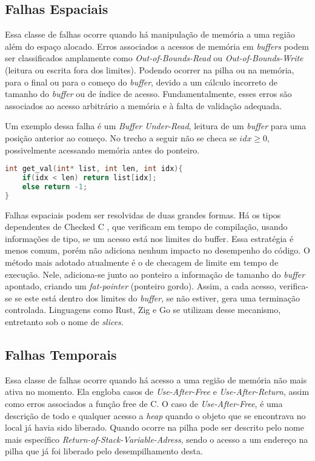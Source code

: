 \subsection{Falhas Espaciais}
\label{sec:mem-error:spacial}

Essa classe de falhas ocorre quando há manipulação de memória a uma região 
além do espaço alocado. Erros associados a acessos de memória em \emph{buffers} 
podem ser classificados amplamente como \emph{Out-of-Bounds-Read} ou \emph{Out-of-Bounds-Write} 
(leitura ou escrita fora dos limites). 
Podendo ocorrer na pilha ou na memória, para o final ou para o começo do \emph{buffer}, 
devido a um cálculo incorreto de tamanho do \emph{buffer} ou de índice de acesso. 
Fundamentalmente, esses erros são associados ao acesso arbitrário a memória e 
à falta de validação adequada.

Um exemplo dessa falha é um \emph{Buffer Under-Read}, 
leitura de um \emph{buffer} para uma posição anterior ao começo. No trecho a seguir
não se checa se $idx \ge 0$, possivelmente acessando memória antes do ponteiro.

\begin{lstlisting}[language=C ,label={lst:spacial-error-c}, caption=Exemplo de uma Falha Espacial]
int get_val(int* list, int len, int idx){
	if(idx < len) return list[idx];
 	else return -1;
}
\end{lstlisting}

Falhas espaciais podem ser resolvidas de duas grandes formas. Há os tipos dependentes de Checked C \cite{CHECKEDC}, que verificam em tempo de compilação, usando informações de tipo, se um acesso está nos limites do buffer. Essa estratégia é menos comum, porém não adiciona nenhum impacto no desempenho do código. 
O método mais adotado atualmente é o de checagem de limite em tempo de execução. Nele, adiciona-se junto ao ponteiro a informação de tamanho do \emph{buffer} apontado, criando um \emph{fat-pointer} (ponteiro gordo). Assim, a cada acesso, verifica-se se este está dentro dos limites do \emph{buffer}, se não estiver, gera uma terminação controlada. Linguagens como Rust, Zig e Go se utilizam desse mecanismo, entretanto sob o nome de \emph{slices}.


\subsection{Falhas Temporais}
\label{sec:mem-error:temporal}

Essa classe de falhas ocorre quando há acesso a uma região de memória não mais ativa no momento. Ela engloba casos de \emph{Use-After-Free} e \emph{Use-After-Return}, assim como erros associados a função free de C. 
O caso de \emph{Use-After-Free}, é uma descrição de todo e qualquer acesso a \emph{heap} quando o objeto que se encontrava no local já havia sido liberado. Quando ocorre na pilha pode ser descrito pelo nome mais específico 
\emph{Return-of-Stack-Variable-Adress}, sendo o acesso a um endereço na pilha que já foi liberado pelo desempilhamento desta.

